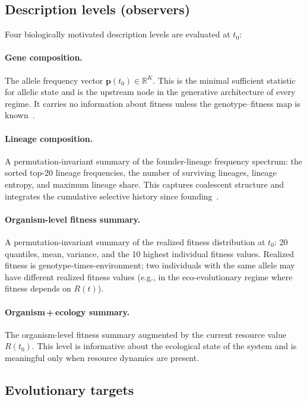 \documentclass[11pt,a4paper]{article}
\begin{document}
\subsection{Description levels (observers)}
\label{sec:observers}

Four biologically motivated description levels are evaluated at $t_0$:

\paragraph{Gene composition.}
The allele frequency vector $\bm{p}(t_0) \in \mathbb{R}^K$.
This is the minimal sufficient statistic for allelic state and is the
upstream node in the generative architecture of every regime.
It carries no information about fitness unless the genotype--fitness
map is known~\citep{Falconer1996, Fisher1930}.

\paragraph{Lineage composition.}
A permutation-invariant summary of the founder-lineage frequency
spectrum: the sorted top-20 lineage frequencies, the number of surviving
lineages, lineage entropy, and maximum lineage share.
This captures coalescent structure and integrates the cumulative selective
history since founding~\citep{Kingman1982, Tajima1983}.

\paragraph{Organism-level fitness summary.}
A permutation-invariant summary of the realized fitness distribution at $t_0$:
20 quantiles, mean, variance, and the 10 highest individual fitness values.
Realized fitness is genotype-times-environment; two individuals with the
same allele may have different realized fitness values (e.g.,
in the eco-evolutionary regime where fitness depends on $R(t)$).

\paragraph{Organism\,+\,ecology summary.}
The organism-level fitness summary augmented by the current resource
value $R(t_0)$.
This level is informative about the ecological state of the system and
is meaningful only when resource dynamics are present.

\subsection{Evolutionary targets}
\label{sec:targets}
\end{document}
